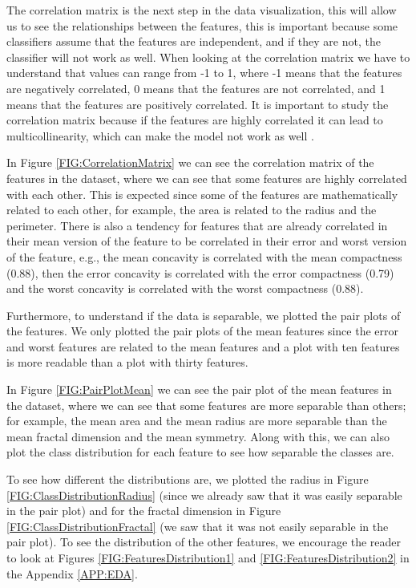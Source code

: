 The correlation matrix is the next step in the data visualization, this will allow us to see the relationships between the features, this is important because some classifiers assume that the features are independent, and if they are not, the classifier will not work as well. When looking at the correlation matrix we have to understand that values can range from -1 to 1, where -1 means that the features are negatively correlated, 0 means that the features are not correlated, and 1 means that the features are positively correlated. It is important to study the correlation matrix because if the features are highly correlated it can lead to multicollinearity, which can make the model not work as well \cite{belsley_regression_2005}.



In Figure \ref{FIG:CorrelationMatrix} we can see the correlation matrix of the features in the dataset, where we can see that some features are highly correlated with each other. This is expected since some of the features are mathematically related to each other, for example, the area is related to the radius and the perimeter. There is also a tendency for features that are already correlated in their mean version of the feature to be correlated in their error and worst version of the feature, e.g., the mean concavity is correlated with the mean compactness (0.88), then the error concavity is correlated with the error compactness (0.79) and the worst concavity is correlated with the worst compactness (0.88).

Furthermore, to understand if the data is separable, we plotted the pair plots of the features. We only plotted the pair plots of the mean features since the error and worst features are related to the mean features and a plot with ten features is more readable than a plot with thirty features.

In Figure \ref{FIG:PairPlotMean} we can see the pair plot of the mean features in the dataset, where we can see that some features are more separable than others; for example, the mean area and the mean radius are more separable than the mean fractal dimension and the mean symmetry. Along with this, we can also plot the class distribution for each feature to see how separable the classes are. 

To see how different the distributions are, we plotted the radius in Figure \ref{FIG:ClassDistributionRadius} (since we already saw that it was easily separable in the pair plot) and for the fractal dimension in Figure \ref{FIG:ClassDistributionFractal} (we saw that it was not easily separable in the pair plot). To see the distribution of the other features, we encourage the reader to look at Figures \ref{FIG:FeaturesDistribution1} and \ref{FIG:FeaturesDistribution2} in the Appendix \ref{APP:EDA}.


